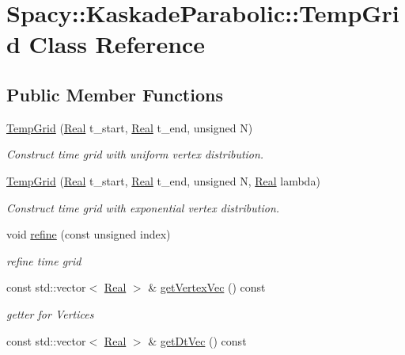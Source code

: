 \hypertarget{classSpacy_1_1KaskadeParabolic_1_1TempGrid}{\section{Spacy\-:\-:Kaskade\-Parabolic\-:\-:Temp\-Grid Class Reference}
\label{classSpacy_1_1KaskadeParabolic_1_1TempGrid}
}
\subsection*{Public Member Functions}
\begin{DoxyCompactItemize}
\item 
\hyperlink{classSpacy_1_1KaskadeParabolic_1_1TempGrid_ab1d72b2c887e6d7d378f4fbfe413ca67}{Temp\-Grid} (\hyperlink{classSpacy_1_1Real}{Real} t\-\_\-start, \hyperlink{classSpacy_1_1Real}{Real} t\-\_\-end, unsigned N)
\begin{DoxyCompactList}\small\item\em Construct time grid with uniform vertex distribution. \end{DoxyCompactList}\item 
\hyperlink{classSpacy_1_1KaskadeParabolic_1_1TempGrid_ab0c64d5d793d66ddcc926e4c410beb93}{Temp\-Grid} (\hyperlink{classSpacy_1_1Real}{Real} t\-\_\-start, \hyperlink{classSpacy_1_1Real}{Real} t\-\_\-end, unsigned N, \hyperlink{classSpacy_1_1Real}{Real} lambda)
\begin{DoxyCompactList}\small\item\em Construct time grid with exponential vertex distribution. \end{DoxyCompactList}\item 
void \hyperlink{classSpacy_1_1KaskadeParabolic_1_1TempGrid_ab2d4a1e6ffde7218b9625ba35403e72b}{refine} (const unsigned index)
\begin{DoxyCompactList}\small\item\em refine time grid \end{DoxyCompactList}\item 
const std\-::vector$<$ \hyperlink{classSpacy_1_1Real}{Real} $>$ \& \hyperlink{classSpacy_1_1KaskadeParabolic_1_1TempGrid_af8d34ae585aba60c90f0fc67e1b30a60}{get\-Vertex\-Vec} () const 
\begin{DoxyCompactList}\small\item\em getter for Vertices \end{DoxyCompactList}\item 
const std\-::vector$<$ \hyperlink{classSpacy_1_1Real}{Real} $>$ \& \hyperlink{classSpacy_1_1KaskadeParabolic_1_1TempGrid_a7e8f2491f711973f2e7288e9e352c4cf}{get\-Dt\-Vec} () const 

\end{DoxyCompactItemize}
